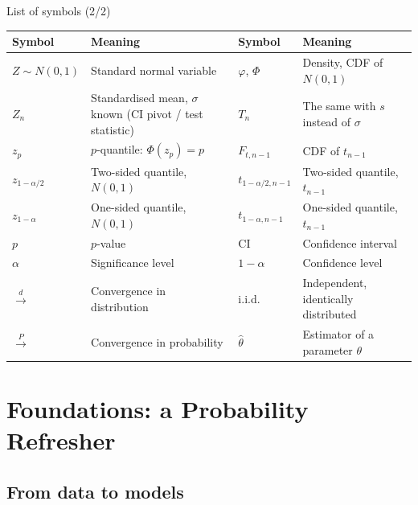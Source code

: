 \documentclass[aspectratio=169,11pt]{beamer}
\begin{document}
\begin{frame}{List of symbols (2/2)}
  \begin{center}
    \small
    \renewcommand{\arraystretch}{1.12}
    \begin{tabular}{@{}l>{\raggedright\arraybackslash}p{4.4cm}l>{\raggedright\arraybackslash}p{4.4cm}@{}}
      \toprule
      \textbf{Symbol} & \textbf{Meaning} & \textbf{Symbol} & \textbf{Meaning} \\
      \midrule
      $Z\sim N(0,1)$     & Standard normal variable & $\varphi$, $\Phi$ & Density, CDF of $N(0,1)$ \\
      $Z_n$              & Standardised mean, $\sigma$ known (CI pivot / test statistic)
                         & $T_n$              & The same with $s$ instead of $\sigma$ \\
      $z_p$              & $p$-quantile: $\Phi(z_p)=p$ & $F_{t,n-1}$ & CDF of $t_{n-1}$ \\
      $z_{1-\alpha/2}$   & Two-sided quantile, $N(0,1)$ & $t_{1-\alpha/2,n-1}$ & Two-sided quantile, $t_{n-1}$ \\
      $z_{1-\alpha}$     & One-sided quantile, $N(0,1)$ & $t_{1-\alpha,n-1}$ & One-sided quantile, $t_{n-1}$ \\
      $p$                & $p$-value                & $\text{CI}$        & Confidence interval \\
      $\alpha$           & Significance level       & $1-\alpha$         & Confidence level \\
      $\xrightarrow{d}$  & Convergence in distribution & i.i.d.  & Independent, identically distributed \\
      $\xrightarrow{P}$  & Convergence in probability & $\hat\theta$ & Estimator of a parameter $\theta$ \\
      \bottomrule
    \end{tabular}
  \end{center}
\end{frame}
\section[Foundations]{Foundations: a Probability Refresher}

\subsection{From data to models}
\end{document}
